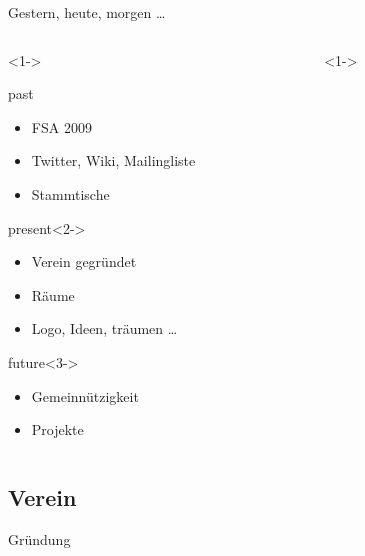 \documentclass[hyperref={pdfpagelabels=false}]{beamer}
\begin{document}
\begin{frame}[label=secddr]{Gestern, heute, morgen \dots}
    \begin{columns}
        \begin{column}{0.5\textwidth}<1->
            \begin{block}{past}
                \begin{itemize}
                    \item FSA 2009
                    \item Twitter, Wiki, Mailingliste
                    \item Stammtische
                \end{itemize}
            \end{block}
            \begin{block}{present}<2->
                \begin{itemize}
                    \item Verein gegründet
                    \item Räume
                    \item Logo, Ideen, träumen \dots
                \end{itemize}
            \end{block}
            \begin{block}{future}<3->
                \begin{itemize}
                    \item Gemeinnützigkeit
                    \item Projekte
                \end{itemize}
            \end{block}
        \end{column}
        \begin{column}{0.5\textwidth}<1->
            \begin{figure}
            \end{figure}
        \end{column}
    \end{columns}
\end{frame}

\subsection{Verein}

\begin{frame}[label=secgruendung]{Gründung}
    \begin{figure}
    \end{figure}
\end{frame}
\end{document}
